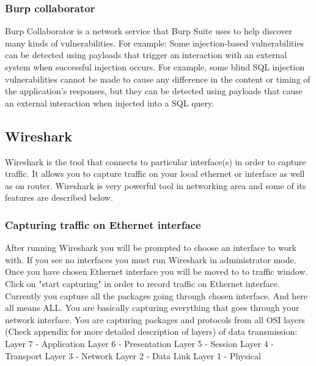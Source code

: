 \subsubsection{Burp collaborator}
\label{subsubsec:burp_collab}
Burp Collaborator is a network service that Burp Suite uses to help discover many kinds of vulnerabilities.
For example: Some injection-based vulnerabilities can be detected using payloads that trigger an interaction with an external system when successful injection occurs.
For example, some blind SQL injection vulnerabilities cannot be made to cause any difference in the content or timing of the application's responses, but they can be detected using payloads that cause an external interaction when injected into a SQL query.




\subsection{Wireshark}
\label{subsec:wireshark}

Wireshark is the tool that connects to particular interface(s) in order to capture traffic.
It allows you to capture traffic on your local ethernet or interface as well as on router.
Wireshark is very powerful tool in networking area and some of its features are described below.

\subsubsection{Capturing traffic on Ethernet interface}

After running Wireshark you will be prompted to choose an interface to work with.
If you see no interfaces you must run Wireshark in administrator mode.
Once you have chosen Ethernet interface you will be moved to to traffic window.
Click on "start capturing" in order to record traffic on Ethernet interface.
Currently you capture all the packages going through chosen interface.
And here all means ALL.
You are basically capturing everything that goes through your network interface.
You are capturing packages and protocols from all OSI layers (Check appendix for more detailed description of layers) of data transmission: \newline \newline
Layer 7 - Application \newline
Layer 6 - Presentation \newline
Layer 5 - Session \newline
Layer 4 - Transport \newline
Layer 3 - Network \newline
Layer 2 - Data Link \newline
Layer 1 - Physical \newline


